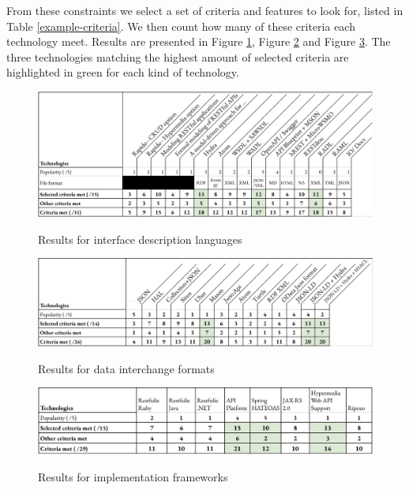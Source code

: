From these constraints we select a set of criteria and features to look for, listed in Table \ref{example-criteria}. We then count how many of these criteria each technology meet. Results are presented in Figure \ref{example-idl-results}, Figure \ref{example-dif-results} and Figure \ref{example-frameworks-results}. The three technologies matching the highest amount of selected criteria are highlighted in green for each kind of technology.



\begin{figure}[ht]
\caption{Results for interface description languages}
\centering
\includegraphics[width=1\textwidth]{figures/example-idl-results.png}
\label{example-idl-results}
\end{figure}

\begin{figure}[ht]
\caption{Results for data interchange formats}
\centering
\includegraphics[width=1\textwidth]{figures/example-dif-results.png}
\label{example-dif-results}
\end{figure}

\begin{figure}[ht]
\caption{Results for implementation frameworks}
\centering
\includegraphics[width=1\textwidth]{figures/example-frameworks-results.png}
\label{example-frameworks-results}
\end{figure}

